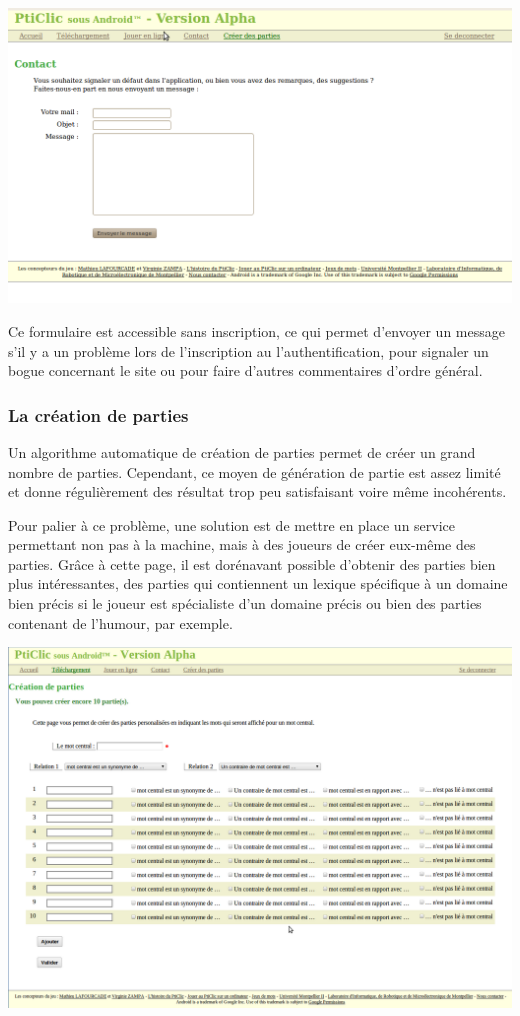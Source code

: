 \documentclass[a4paper,11pt,french]{article}
\begin{document}
\begin{center}
\includegraphics[width=14cm]{img/siteContact.png}
\end{center}

Ce formulaire est accessible sans inscription, ce qui permet d'envoyer un message s'il y a un problème lors de l'inscription au l'authentification, pour signaler un bogue concernant le site ou pour faire d'autres commentaires d'ordre général.

\subsubsection{La création de parties}
Un algorithme automatique de création de parties permet de créer un grand nombre de parties. Cependant, ce moyen
de génération de partie est assez limité et donne régulièrement des résultat trop peu satisfaisant voire même incohérents.

Pour palier à ce problème, une solution est de mettre en place un service permettant non pas à la machine, mais à des joueurs de créer eux-même des parties. Grâce à cette page, il est dorénavant possible d'obtenir des parties bien plus intéressantes, des parties qui contiennent un lexique spécifique à un domaine bien précis si le joueur est spécialiste d'un domaine précis ou bien des parties contenant de l'humour, par exemple. 


\begin{center}
\includegraphics[width=14cm]{img/siteCreerParties.png}
\end{center}
\end{document}
